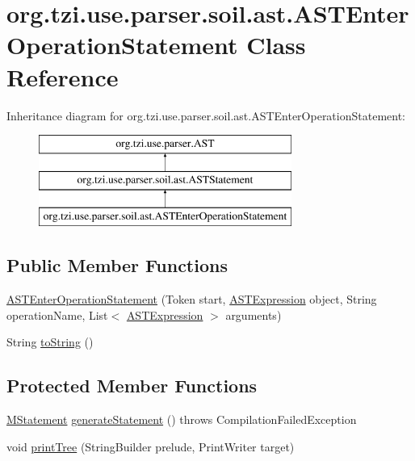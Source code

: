 \hypertarget{classorg_1_1tzi_1_1use_1_1parser_1_1soil_1_1ast_1_1_a_s_t_enter_operation_statement}{\section{org.\-tzi.\-use.\-parser.\-soil.\-ast.\-A\-S\-T\-Enter\-Operation\-Statement Class Reference}
\label{classorg_1_1tzi_1_1use_1_1parser_1_1soil_1_1ast_1_1_a_s_t_enter_operation_statement}
}
Inheritance diagram for org.\-tzi.\-use.\-parser.\-soil.\-ast.\-A\-S\-T\-Enter\-Operation\-Statement\-:\begin{figure}[H]
\begin{center}
\leavevmode
\includegraphics[height=3.000000cm]{classorg_1_1tzi_1_1use_1_1parser_1_1soil_1_1ast_1_1_a_s_t_enter_operation_statement}
\end{center}
\end{figure}
\subsection*{Public Member Functions}
\begin{DoxyCompactItemize}
\item 
\hyperlink{classorg_1_1tzi_1_1use_1_1parser_1_1soil_1_1ast_1_1_a_s_t_enter_operation_statement_afcf3ed053affbd9342bec69fe7f92414}{A\-S\-T\-Enter\-Operation\-Statement} (Token start, \hyperlink{classorg_1_1tzi_1_1use_1_1parser_1_1ocl_1_1_a_s_t_expression}{A\-S\-T\-Expression} object, String operation\-Name, List$<$ \hyperlink{classorg_1_1tzi_1_1use_1_1parser_1_1ocl_1_1_a_s_t_expression}{A\-S\-T\-Expression} $>$ arguments)
\item 
String \hyperlink{classorg_1_1tzi_1_1use_1_1parser_1_1soil_1_1ast_1_1_a_s_t_enter_operation_statement_af48f53a6cc2b10b99799aab9544d2553}{to\-String} ()
\end{DoxyCompactItemize}
\subsection*{Protected Member Functions}
\begin{DoxyCompactItemize}
\item 
\hyperlink{classorg_1_1tzi_1_1use_1_1uml_1_1sys_1_1soil_1_1_m_statement}{M\-Statement} \hyperlink{classorg_1_1tzi_1_1use_1_1parser_1_1soil_1_1ast_1_1_a_s_t_enter_operation_statement_a765df890f0f04adce39df91c51fbe3ac}{generate\-Statement} ()  throws Compilation\-Failed\-Exception 
\item 
void \hyperlink{classorg_1_1tzi_1_1use_1_1parser_1_1soil_1_1ast_1_1_a_s_t_enter_operation_statement_aed56d5ae7e65c1e983f73baf29130daf}{print\-Tree} (String\-Builder prelude, Print\-Writer target)
\end{DoxyCompactItemize}

